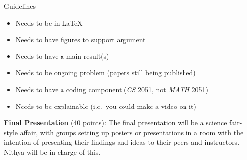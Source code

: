 \documentclass{article}
\begin{document}
\begin{itemize}
    
Guidelines
\begin{itemize}
    \item Needs to be in \LaTeX
    \item Needs to have figures to support argument
    \item Needs to have a main result(s)
    \item Needs to be ongoing problem (papers still being published)
    \item Needs to have a coding component (\textit{CS} 2051, not \textit{MATH} 2051)
    \item Needs to be explainable (i.e.\ you could make a video on it)
\end{itemize}
    

    \textbf{Final Presentation} (40 points): The final presentation will be a science fair-style affair, with groups setting up posters or presentations in a room with the intention of presenting their findings and ideas to their peers and instructors. Nithya will be in charge of this.
\end{itemize}
\end{document}
